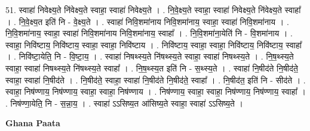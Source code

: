 \documentclass[17pt]{extarticle}
\begin{document}
51. स्वाहा॑ निवेक्ष्य॒ते नि॑वेक्ष्य॒ते स्वाहा॒ स्वाहा॑ निवेक्ष्य॒ते । . नि॒वे॒क्ष्य॒ते स्वाहा॒ स्वाहा॑ निवेक्ष्य॒ते नि॑वेक्ष्य॒ते स्वाहा᳚ । . नि॒वे॒क्ष्य॒त इति॑ नि - वे॒क्ष्य॒ते । . स्वाहा॑ निवि॒शमा॑नाय निवि॒शमा॑नाय॒ स्वाहा॒ स्वाहा॑ निवि॒शमा॑नाय । . नि॒वि॒शमा॑नाय॒ स्वाहा॒ स्वाहा॑ निवि॒शमा॑नाय निवि॒शमा॑नाय॒ स्वाहा᳚ । . नि॒वि॒शमा॑ना॒येति॑ नि - वि॒शमा॑नाय । . स्वाहा॒ निवि॑ष्टाय॒ निवि॑ष्टाय॒ स्वाहा॒ स्वाहा॒ निवि॑ष्टाय । . निवि॑ष्टाय॒ स्वाहा॒ स्वाहा॒ निवि॑ष्टाय॒ निवि॑ष्टाय॒ स्वाहा᳚ । . निवि॑ष्टा॒येति॒ नि - वि॒ष्टा॒य॒ । . स्वाहा॑ निषथ्स्य॒ते नि॑षथ्स्य॒ते स्वाहा॒ स्वाहा॑ निषथ्स्य॒ते । . नि॒ष॒थ्स्य॒ते स्वाहा॒ स्वाहा॑ निषथ्स्य॒ते नि॑षथ्स्य॒ते स्वाहा᳚ । . नि॒ष॒थ्स्य॒त इति॑ नि - स॒थ्स्य॒ते । . स्वाहा॑ नि॒षीद॑ते नि॒षीद॑ते॒ स्वाहा॒ स्वाहा॑ नि॒षीद॑ते । . नि॒षीद॑ते॒ स्वाहा॒ स्वाहा॑ नि॒षीद॑ते नि॒षीद॑ते॒ स्वाहा᳚ । . नि॒षीद॑त॒ इति॑ नि - सीद॑ते । . स्वाहा॒ निष॑ण्णाय॒ निष॑ण्णाय॒ स्वाहा॒ स्वाहा॒ निष॑ण्णाय । . निष॑ण्णाय॒ स्वाहा॒ स्वाहा॒ निष॑ण्णाय॒ निष॑ण्णाय॒ स्वाहा᳚ । . निष॑ण्णा॒येति॒ नि - स॒न्ना॒य॒ । . स्वाहा॑ ऽऽसिष्य॒त आ॑सिष्य॒ते स्वाहा॒ स्वाहा॑ ऽऽसिष्य॒ते । \newline

\textbf{Ghana Paata } \newline
\end{document}
